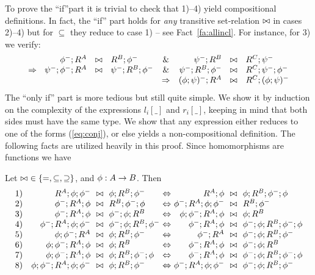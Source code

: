 \documentclass[10pt]{article}
\begin{document}
To prove the ``if''part it is trivial to check that 1)--4) yield
compositional definitions. In fact, the ``if'' part holds for {\em
any} transitive set-relation $\bowtie$ in cases 2)--4) but for
$\subseteq$ 
 they reduce to case 1) -- see Fact~\ref{fa:allincl}.
For instance, for 3) we verify:
\[ 
\begin{array}{rclcrcl} 
\phi^-;R^A &\any & R^B;\phi^- & 
         \& &  \psi^-;R^B & \any & R^C;\psi^- \\
\impl\ \ \psi^-;\phi^-;R^A & \any & \psi^-;R^B;\phi^- & 
         \& & \psi^-;R^B;\phi^- &\any &R^C;\psi^-;\phi^-   \\%
& & & \impl & (\phi;\psi)^-;R^A & \any & R^C;(\phi;\psi)^-
\end{array}
\]
The ``only if'' part is more tedious but still quite simple.
We show it by induction on the complexity of the
expressions $l_i[\_]$ and $r_i[\_]$, keeping in mind that both sides
must have the same type. We
show that any expression either reduces to one of the forms
(\ref{eq:conj}), or else yields a non-compositional
definition.
The following facts are utilized heavily in this proof.
Since homomorphisms are functions we have
%
\begin{Fact}
\label{fa:facts}
Let $\bowtie\ \in\{=,\subseteq,\supseteq\}$, and $\phi:A\rightarrow B$. Then
\[
\begin{array}{r@{)\ \ \ }r@{\ \ \any\ \ }l@{\ \Iff\ }r@{\ \ \any\ \ }l}
1 & R^A;\phi;\phi^- & \phi;R^B;\phi^- & R^A;\phi & \phi;R^B;\phi^-;\phi \\
2 & \phi^-;R^A;\phi & R^B;\phi^-;\phi &\phi^-;R^A;\phi;\phi^- & R^B;\phi^- \\
3 & \phi^-;R^A;\phi & \phi^-;\phi;R^B  & \phi;\phi^-;R^A;\phi &\phi;R^B \\
4 & \phi^-;R^A;\phi;\phi^-  & \phi^-;\phi;R^B;\phi^- &
        \phi^-;R^A;\phi & \phi^-;\phi;R^B;\phi^-;\phi \\
5 & \phi;\phi^-;R^A & \phi;R^B;\phi^- & 
        \phi^-;R^A & \phi^-;\phi;R^B;\phi^- \\
6 &\phi;\phi^-;R^A;\phi & \phi;R^B & 
        \phi^-;R^A;\phi & \phi^-;\phi;R^B \\
7 &\phi;\phi^-;R^A;\phi & \phi;R^B;\phi^-;\phi & 
        \phi^-;R^A;\phi & \phi^-;\phi;R^B;\phi^-;\phi \\
8 &\phi;\phi^-;R^A;\phi;\phi^- & \phi;R^B;\phi^- &
        \phi^-;R^A;\phi;\phi^- & \phi^-;\phi;R^B;\phi^-
\end{array}
\]
\end{Fact}
\end{document}
